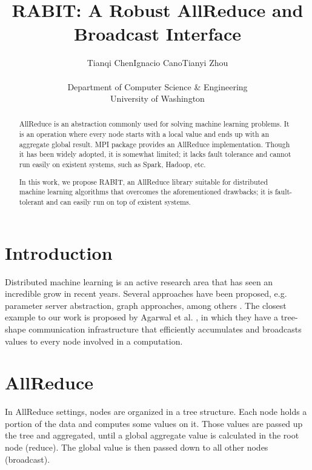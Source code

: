 \documentclass[10pt,twocolumn]{article}
\newcommand{\todo}[1]{\noindent{\textcolor{red}{\{{\bf TODO:}  #1\}}}}
\begin{document}
\title{\bf RABIT: A Robust AllReduce and Broadcast Interface}
\author{Tianqi Chen\hspace{0.5in}Ignacio Cano\hspace{0.5in}Tianyi Zhou \\\\
Department of Computer Science \& Engineering \\
University of Washington\\
}
\date{}
\maketitle
\thispagestyle{empty}

\begin{abstract}

AllReduce is an abstraction commonly used for solving machine learning problems. It is an operation where every node starts with a local value and ends up with an aggregate global result.
MPI package provides an AllReduce implementation. Though it has been widely adopted, it is somewhat limited; it lacks fault tolerance and cannot run easily on existent systems, such as Spark, Hadoop, etc.

In this work, we propose RABIT, an AllReduce library suitable for distributed machine learning algorithms that overcomes the aforementioned drawbacks; it is fault-tolerant and can easily run on top of existent systems.

\end{abstract}

\section{Introduction}
Distributed machine learning is an active research area that has seen an incredible grow in recent years. Several approaches have been proposed, e.g. parameter server abstraction, graph approaches, among others \cite{paramServer,DuchiAW12,Zinkevich,Dekel,Low}. The closest example to our work is proposed by Agarwal et al. \cite{Agarwal}, in which they have a tree-shape communication infrastructure that efficiently accumulates and broadcasts values to every node involved in a computation.
\todo{add more}

\section{AllReduce}

In AllReduce settings, nodes are organized in a tree structure. Each node holds a portion of the data and computes some values on it. Those values are passed up the tree and aggregated, until a global aggregate value is calculated in the root node (reduce). The global value is then passed down to all other nodes (broadcast). 
\end{document}
